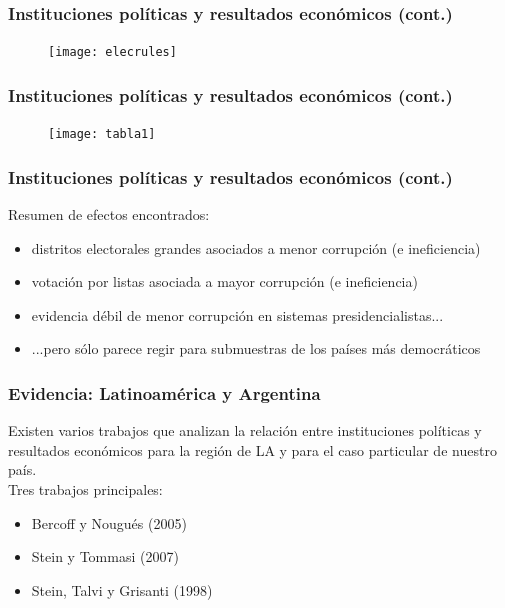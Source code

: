 \documentclass[handout,final,xcolor=dvipsnames]{beamer}
\begin{document}
\begin{frame}\frametitle{Instituciones políticas y resultados económicos (cont.)}
  \begin{figure}[htbp]
    \centering
    \texttt{[image: elecrules]}
  \end{figure}
\end{frame}


\begin{frame}\frametitle{Instituciones políticas y resultados económicos (cont.)}
\begin{figure}[htbp]
    \centering
    \texttt{[image: tabla1]}
  \end{figure}
\end{frame}


\begin{frame}\frametitle{Instituciones políticas y resultados económicos (cont.)}
Resumen de efectos encontrados:
\begin{itemize} \itemsep 10pt
\item distritos electorales grandes asociados a menor corrupción (e ineficiencia)
\item votación por listas asociada a mayor corrupción (e ineficiencia)
\item evidencia débil de menor corrupción en sistemas presidencialistas...
\item ...pero sólo parece regir para submuestras de los países más democráticos
\end{itemize}
\end{frame}


\begin{frame}\frametitle{Evidencia: Latinoamérica y Argentina}
Existen varios trabajos que analizan la relación entre instituciones políticas y resultados
económicos para la región de LA y para el caso particular de nuestro país. \\ \medskip 
Tres trabajos principales: \medskip 
\begin{itemize} \itemsep 10pt
\item Bercoff y Nougués (2005)
\item Stein y Tommasi (2007)
\item Stein, Talvi y Grisanti (1998)
\end{itemize}
\end{frame}
\end{document}
